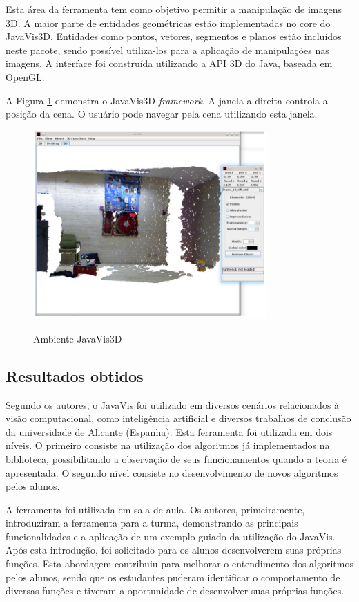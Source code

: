 \documentclass[
	12pt,				%
	oneside,			%
	a4paper,			%
	english,			%
	french,				%
	spanish,			%
	brazil,				%
	]{abntex2}
\begin{document}
Esta área da ferramenta tem como objetivo permitir a manipulação de imagens 3D. A maior parte de entidades geométricas estão implementadas no core do JavaVis3D. Entidades como pontos, vetores, segmentos e planos estão incluídos neste pacote, sendo possível utiliza-los para a aplicação de manipulações nas imagens. A interface foi construída utilizando a API 3D do Java, baseada em OpenGL.

A Figura \ref{fig:javavis_3d} demonstra o JavaVis3D \textit{framework}. A janela a direita controla a posição da cena. O usuário pode navegar pela cena utilizando esta janela.

\begin{figure}[ht]
\centering
\caption{Ambiente JavaVis3D}
\includegraphics[width=0.8\textwidth]{imagens/javavis_3d.png}
\label{fig:javavis_3d}
\end{figure}

\subsection{Resultados obtidos}

Segundo os autores, o JavaVis foi utilizado em diversos cenários relacionados à visão computacional, como inteligência artificial e diversos trabalhos de conclusão da universidade de Alicante (Espanha). Esta ferramenta foi utilizada em dois níveis. O primeiro consiste na utilização dos algoritmos já implementados na biblioteca, possibilitando a observação de seus funcionamentos quando a teoria é apresentada. O segundo nível consiste no desenvolvimento de novos algoritmos pelos alunos.

A ferramenta foi utilizada em sala de aula. Os autores, primeiramente, introduziram a ferramenta para a turma, demonstrando as principais funcionalidades e a aplicação de um exemplo guiado da utilização do JavaVis. Após esta introdução, foi solicitado para os alunos desenvolverem suas próprias funções. Esta abordagem contribuiu para melhorar o entendimento dos algoritmos pelos alunos, sendo que os estudantes puderam identificar o comportamento de diversas funções e tiveram a oportunidade de desenvolver suas próprias funções.
\end{document}
